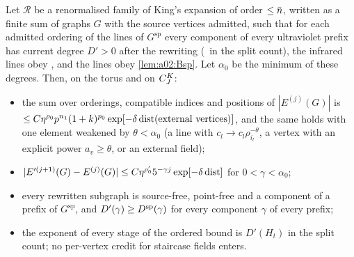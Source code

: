 \begin{theorem}\label{thm:a02:S3}
Let $\mathcal R$ be a renormalised family of King's expansion of order $\le\bar n$, written as a finite sum of graphs $G$ with the source vertices admitted, such that for each admitted ordering of the lines of $G^{\mathrm{sp}}$ every component of every ultraviolet prefix has current degree $D'>0$ after the rewriting (\DEG\ in the split count), the infrared lines obey \cite[(3.78)]{K1}, and the lines obey \cref{lem:a02:Bsp}. Let $\alpha_0$ be the minimum of these degrees. Then, on the torus and on $C^{K}_{J}$:
\begin{itemize}[nosep]
\item[(a)] the sum over orderings, compatible indices and positions of $|E^{(j)}(G)|$ is $\le C\eta^{\rho_0}p^{n_1}(1+k)^{p_0}\exp[-\delta\operatorname{dist}(\text{external vertices})]$, and the same holds with one element weakened by $\theta<\alpha_0$ (a line with $c_l\to c_l\rho_{i_l}^{-\theta}$, a vertex with an explicit power $a_v\ge\theta$, or an external field);
\item[(b)] $|E'^{(j+1)}(G)-E^{(j)}(G)|\le C\eta^{\rho'_0}5^{-\gamma j}\exp[-\delta\operatorname{dist}]$ for $0<\gamma<\alpha_0$;
\item[(c)] every rewritten subgraph is source-free, point-free and a component of a prefix of $G^{\mathrm{sp}}$, and $D'(\gamma)\ge D^{\mathrm{sp}}(\gamma)$ for every component $\gamma$ of every prefix;
\item[(d)] the exponent of every stage of the ordered bound is $D'(H_t)$ in the split count; no per-vertex credit for staircase fields enters.
\end{itemize}
\end{theorem}
